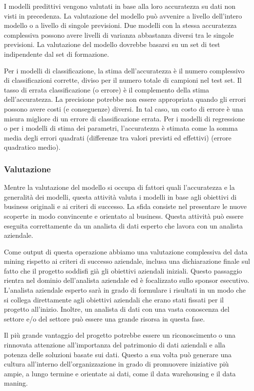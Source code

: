 \documentclass[a4paper]{extarticle}
\begin{document}
I modelli predittivi vengono valutati in base alla loro accuratezza su dati non visti in precedenza. La valutazione del modello può avvenire a livello dell'intero modello o a livello di singole previsioni. Due modelli con la stessa accuratezza complessiva possono avere livelli di varianza abbastanza diversi tra le singole previsioni. La valutazione del modello dovrebbe basarsi su un set di test indipendente dal set di formazione.

Per i modelli di classificazione, la stima dell'accuratezza è il numero complessivo di classificazioni corrette, diviso per il numero totale di campioni nel test set. Il tasso di errata classificazione (o errore) è il complemento della stima dell'accuratezza. La precisione potrebbe non essere appropriata quando gli errori possono avere costi (e conseguenze) diversi. In tal caso, un costo di errore è una misura migliore di un errore di classificazione errata. Per i modelli di regressione o per i modelli di stima dei parametri, l'accuratezza è stimata come la somma media degli errori quadrati (differenze tra valori previsti ed effettivi) (errore quadratico medio).

\subsubsection{Valutazione}

Mentre la valutazione del modello si occupa di fattori quali l'accuratezza e la generalità dei modelli, questa attività valuta i modelli in base agli obiettivi di business originali e ai criteri di successo. La sfida consiste nel presentare le nuove scoperte in modo convincente e orientato al business. Questa attività può essere eseguita correttamente da un analista di dati esperto che lavora con un analista aziendale.

Come output di questa operazione abbiamo una valutazione complessiva del data mining rispetto ai criteri di successo aziendale, inclusa una dichiarazione finale sul fatto che il progetto soddisfi già gli obiettivi aziendali iniziali. Questo passaggio rientra nel dominio dell'analista aziendale ed è focalizzato sullo sponsor esecutivo. L'analista aziendale esperto sarà in grado di formulare i risultati in un modo che si collega direttamente agli obiettivi aziendali che erano stati fissati per il progetto all'inizio. Inoltre, un analista di dati con una vasta conoscenza del settore e/o del settore può essere una grande risorsa in questa fase.

Il più grande vantaggio del progetto potrebbe essere un riconoscimento o una rinnovata attenzione all'importanza del patrimonio di dati aziendali e alla potenza delle soluzioni basate sui dati. Questo a sua volta può generare una cultura all'interno dell'organizzazione in grado di promuovere iniziative più ampie, a lungo termine e orientate ai dati, come il data warehousing e il data maning.
\end{document}
